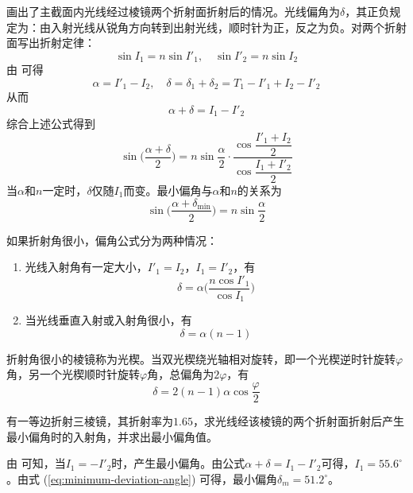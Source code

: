 \documentclass[cn,10pt,chinesefont=founder,math=mtpro2,cite=super,toc=onecol,twoside,openany]{elegantbook}
\begin{document}
 画出了主截面内光线经过棱镜两个折射面折射后的情况。光线偏角为$\delta$，其正负规定为：由入射光线从锐角方向转到出射光线，顺时针为正，反之为负。对两个折射面写出折射定律：
\begin{equation}
\sin I_1=n\sin I'_1,\quad
\sin I'_2=n\sin I_2
\end{equation}
由 可得
\begin{equation}
\alpha=I'_1-I_2,\quad\delta=\delta_1+\delta_2=T_1-I'_1+I_2-I'_2
\end{equation}
从而
\begin{equation}
\alpha+\delta=I_1-I'_2
\end{equation}
综合上述公式得到
\begin{equation}
\sin\bigg(\frac{\alpha+\delta}{2}\bigg)=n\sin\frac{\alpha}{2}\cdot\frac{\cos\dfrac{I'_1+I_2}{2}}{\cos\dfrac{I_1+I'_2}{2}}
\end{equation}
当$\alpha$和$n$一定时，$\delta$仅随$I_1$而变。最小偏角与$\alpha$和$n$的关系为
\begin{equation}
\sin\bigg(\frac{\alpha+\delta_{\mathrm{min}}}{2}\bigg)=n\sin\frac{\alpha}{2}
\label{eq:minimum-deviation-angle}
\end{equation}

如果折射角很小，偏角公式分为两种情况：
\begin{enumerate}
	\item 光线入射角有一定大小，$I'_1=I_2$，$I_1=I'_2$，有
	\begin{equation}
	\delta=\alpha\bigg(\frac{n\cos I'_1}{\cos I_1}\bigg)
	\end{equation}
	\item 当光线垂直入射或入射角很小，有
	\begin{equation}
	\delta=\alpha(n-1)
	\end{equation}
\end{enumerate}

折射角很小的棱镜称为光楔。当双光楔绕光轴相对旋转，即一个光楔逆时针旋转$\varphi$角，另一个光楔顺时针旋转$\varphi$角，总偏角为$2\varphi$，有
\begin{equation}
\delta=2(n-1)\alpha\cos\frac{\varphi}{2}
\end{equation}

\begin{problem}
	有一等边折射三棱镜，其折射率为$1.65$，求光线经该棱镜的两个折射面折射后产生最小偏角时的入射角，并求出最小偏角值。
\end{problem}
\begin{solution}
	由 可知，当$I_1=-I'_2$时，产生最小偏角。由公式$\alpha+\delta=I_1-I'_2$可得，$I_1=55.6^{\circ}$。由式 (\ref{eq:minimum-deviation-angle}) 可得，最小偏角$\delta_m=51.2^{\circ}$。
\end{solution}
\end{document}
